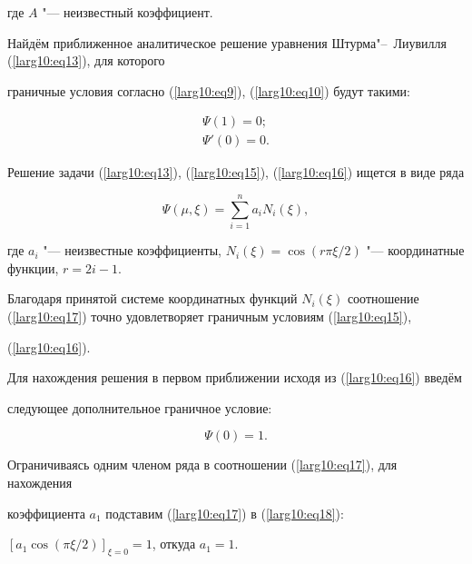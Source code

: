 где $A$ "--- неизвестный коэффициент.



Найдём приближенное аналитическое решение уравнения Штурма"--~Лиувилля (\ref{larg10:eq13}), для которого

граничные условия согласно (\ref{larg10:eq9}), (\ref{larg10:eq10}) будут такими:

\begin{gather}

\label{larg10:eq15}

\Psi (1)=0;\\

\label{larg10:eq16}

\Psi'(0)=0.

\end{gather}

Решение задачи (\ref{larg10:eq13}), (\ref{larg10:eq15}), (\ref{larg10:eq16}) ищется в виде ряда

\begin{equation}

\label{larg10:eq17}

\Psi (\mu ,\xi )=\sum\limits_{i=1}^n a_i N_i (\xi ),

\end{equation}

где $a_i$ "--- неизвестные коэффициенты, $N_i (\xi)=\cos (r\pi {\xi}/{2})$  "--- координатные функции, $r=2i-1$.

Благодаря принятой системе координатных функций $N_i (\xi)$ соотношение (\ref{larg10:eq17}) точно удовлетворяет граничным условиям (\ref{larg10:eq15}),

(\ref{larg10:eq16}).



Для нахождения решения в первом приближении исходя из (\ref{larg10:eq16}) введём

следующее дополнительное граничное условие:

\begin{equation}

\label{larg10:eq18}

\Psi (0)=1.

\end{equation}

Ограничиваясь одним членом ряда в соотношении (\ref{larg10:eq17}), для нахождения

коэффициента $a_1$ подставим (\ref{larg10:eq17}) в (\ref{larg10:eq18}):

$[a_1 \cos ({\pi }\xi/2 )]_{\xi =0} =1$, откуда $a_1 = 1$.


